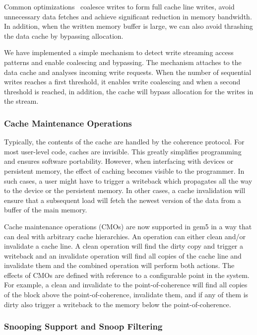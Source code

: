 Common optimizations~\cite{10.1145/173682.165154} coalesce writes to form full cache line writes, avoid unnecessary data fetches and achieve significant reduction in memory bandwidth.
In addition, when the written memory buffer is large, we can also avoid thrashing the data cache by bypassing allocation.

We have implemented a simple mechanism to detect write streaming access patterns and enable coalescing and bypassing.
The mechanism attaches to the data cache and analyses incoming write requests. When the number of sequential writes reaches a first threshold, it enables write coalescing and when a second threshold is reached, in addition, the cache will bypass allocation for the writes in the stream.

\subsubsection[Cache Maintenance Operations]{Cache Maintenance Operations}

Typically, the contents of the cache are handled by the coherence protocol.
For most user-level code, caches are invisible.
This greatly simplifies programming and ensures software portability.
However, when interfacing with devices or persistent memory, the effect of caching becomes visible to the programmer.
In such cases, a user might have to trigger a writeback which propagates all the way to the device or the persistent memory.
In other cases, a cache invalidation will ensure that a subsequent load will fetch the newest version of the data from a buffer of the main memory.

Cache maintenance operations (CMOs) are now supported in gem5 in a way that can deal with arbitrary cache hierarchies.
An operation can either clean and/or invalidate a cache line.
A clean
operation will find the dirty copy and trigger a writeback and an invalidate operation will find all copies of the cache line and invalidate them and the combined operation will perform both actions.
The effects of CMOs are defined with reference to a configurable point in the system.
For example, a clean and invalidate to the point-of-coherence will find all copies of the block above the point-of-coherence, invalidate them, and if any of them is dirty also trigger a writeback to the memory below the point-of-coherence.

\subsubsection[Snooping Support and Snoop Filtering]{Snooping Support and Snoop Filtering}

